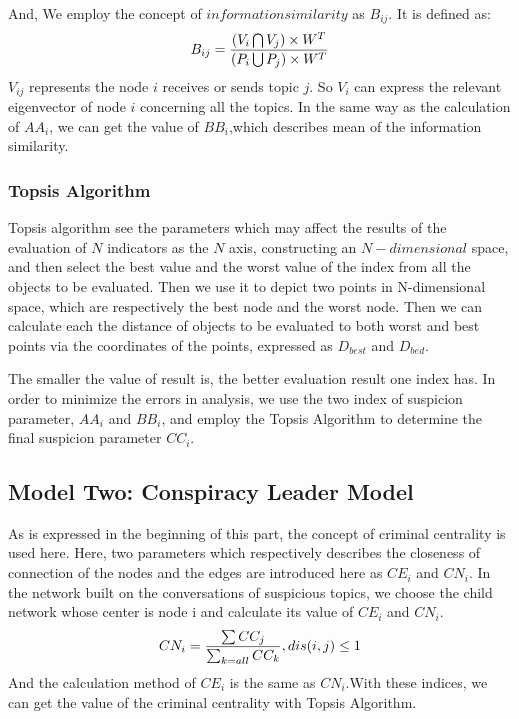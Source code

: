 \documentclass[12pt]{article}
\begin{document}
	And, We employ the concept of $information similarity$ as  $B_{ij}$. It is defined as:
\begin{equation}
\centering
B_{ij} = \frac{(V_i \bigcap V_j) \times W^T}{(P_i \bigcup P_j) \times W^T}
\end{equation}
	$V_{ij}$ represents the node $i$ receives or sends topic $j$. So $V_i$ can express the relevant eigenvector of node $i$ concerning all the topics. In the same way as the calculation of $AA_i$, we can get the value of $BB_i$,which describes mean of the information similarity.

\subsubsection{Topsis Algorithm}
	Topsis algorithm see the parameters which may affect the results of the evaluation of $N$ indicators as the $N$ axis, constructing an $N-dimensional$ space, and then select the best value and the worst value of the index from all the objects to be evaluated. Then we use it to depict two points in N-dimensional space, which are respectively the best node and the worst node. Then we can calculate each the distance of objects to be evaluated to both worst and best points via the coordinates of the points, expressed as $D_{best}$ and $D_{bed}$.

	The smaller the value of result is, the better evaluation result one index has. In order to minimize the errors in analysis, we use the two index of suspicion parameter, $AA_i$ and $BB_i$, and employ the Topsis Algorithm to determine the final suspicion parameter $CC_i$.

	
\subsection{Model Two: Conspiracy Leader Model}
	As is expressed in the beginning of this part, the concept of criminal centrality is used here.
	Here, two parameters which respectively describes the closeness of connection of the nodes and the edges are introduced here as $CE_i$ and $CN_i$. In the network built on the conversations of suspicious topics, we choose the child network whose center is node i and calculate its value of $CE_i$ and $CN_i$.
\begin{equation}
\centering
CN_i = \frac{\sum CC_j}{\sum_{k=all} CC_k} , dis(i,j) \le 1
\end{equation}
	And the calculation method of  $CE_i$ is the same as $CN_i$.With these indices, we can get the value of the criminal centrality with Topsis Algorithm.
\end{document}
